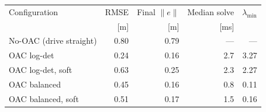 \begin{tabular}{lrrrr}
\toprule
Configuration & RMSE & Final $\|e\|$ & Median solve & $\lambda_{\min}$ \\
 & [m] & [m] & [ms] & \\
\midrule
No-OAC (drive straight) & 0.80 & 0.79 & --- & --- \\
\midrule
OAC log-det & 0.24 & 0.16 & 2.7 & 3.27 \\
OAC log-det, soft & 0.63 & 0.25 & 2.3 & 2.27 \\
OAC balanced & 0.45 & 0.16 & 0.8 & 0.11 \\
OAC balanced, soft & 0.51 & 0.17 & 1.5 & 0.16 \\
\bottomrule
\end{tabular}